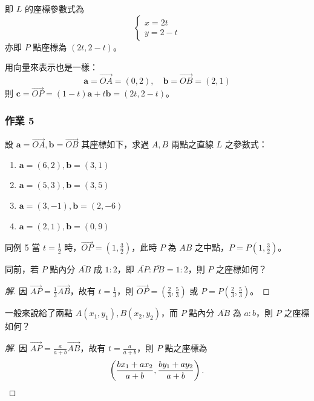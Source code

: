 即 $L$ 的座標參數式為
\[ \begin{cases} x = 2t \\ y = 2 - t \end{cases} \]
亦即 $P$ 點座標為 $(2t, 2 - t)$。

用向量來表示也是一樣：
\[ \mathbf{a} = \vec{OA} = (0, 2), \quad \mathbf{b} = \vec{OB} = (2, 1) \]
則 $\mathbf{c} = \vec{OP} = (1 - t)\mathbf{a} + t\mathbf{b} = (2t, 2 - t)$。

\subsubsection*{作業 5}
設 $\mathbf{a} = \vec{OA}, \mathbf{b} = \vec{OB}$ 其座標如下，求過 $A, B$ 兩點之直線 $L$ 之參數式：
\begin{enumerate}[label=(\roman*), leftmargin=2em]
  \item $\mathbf{a} = (6, 2), \mathbf{b} = (3, 1)$
  \item $\mathbf{a} = (5, 3), \mathbf{b} = (3, 5)$
  \item $\mathbf{a} = (3, -1), \mathbf{b} = (2, -6)$
  \item $\mathbf{a} = (2, 1), \mathbf{b} = (0, 9)$
\end{enumerate}

\begin{example}[例 6]
同例 5 當 $t = \frac{1}{2}$ 時，$\vec{OP} = (1, \frac{3}{2})$，此時 $P$ 為 $AB$ 之中點，$P = P(1, \frac{3}{2})$。
\end{example}

\begin{example}[例 7]
同前，若 $P$ 點內分 $\overline{AB}$ 成 $1 : 2$，即 $\overline{AP} : \overline{PB} = 1 : 2$，則 $P$ 之座標如何？
\end{example}

\begin{proof}[解]
因 $\vec{AP} = \frac{1}{3}\vec{AB}$，故有 $t = \frac{1}{3}$，則 $\vec{OP} = (\frac{2}{3}, \frac{5}{3})$ 或 $P = P(\frac{2}{3}, \frac{5}{3})$。
\end{proof}

\begin{example}[論例 2]
一般來說給了兩點 $A(x_1, y_1), B(x_2, y_2)$，而 $P$ 點內分 $\overline{AB}$ 為 $a : b$，則 $P$ 之座標如何？
\end{example}

\begin{proof}[解]
因 $\vec{AP} = \frac{a}{a+b}\vec{AB}$，故有 $t = \frac{a}{a+b}$，則 $P$ 點之座標為
\[ \left( \frac{b x_1 + a x_2}{a + b}, \frac{b y_1 + a y_2}{a + b} \right). \qedhere \]
\end{proof}

